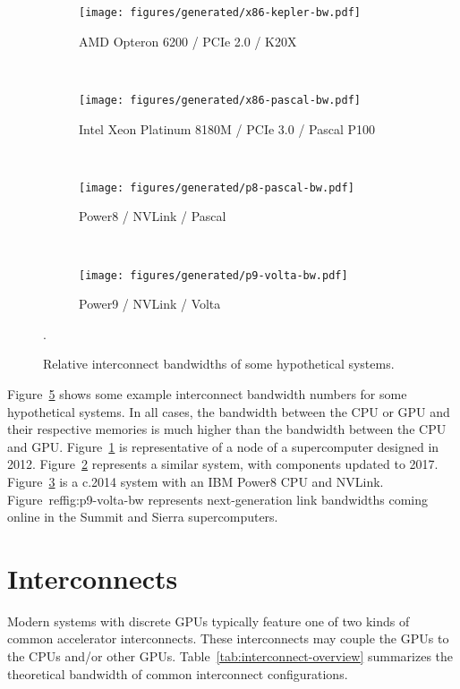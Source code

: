 \begin{figure}[ht]
    \centering
    \begin{subfigure}[b]{0.2\textwidth}
        \texttt{[image: figures/generated/x86-kepler-bw.pdf]}
        \caption{AMD Opteron 6200 / PCIe 2.0 / K20X }
        \label{fig:x86-kepler-bw}
    \end{subfigure}
	~
	\begin{subfigure}[b]{0.2\textwidth}
        \texttt{[image: figures/generated/x86-pascal-bw.pdf]}
        \caption{Intel Xeon Platinum 8180M / PCIe 3.0 / Pascal P100}
        \label{fig:x86-pascal-bw}
    \end{subfigure}
    ~
    \begin{subfigure}[b]{0.2\textwidth}
        \texttt{[image: figures/generated/p8-pascal-bw.pdf]}
        \caption{Power8 / NVLink / Pascal}
        \label{fig:p8-pascal-bw}
    \end{subfigure}
    ~
    \begin{subfigure}[b]{0.2\textwidth}
        \texttt{[image: figures/generated/p9-volta-bw.pdf]}
        \caption{Power9 / NVLink / Volta}
        \label{fig:p9-pascal-bw}
    \end{subfigure}
    \caption[]{Relative interconnect bandwidths of some hypothetical systems. \cite{amd2012opteron6200} \cite{stuechli2013power8}}.
    \label{fig:gpu-sys-arch}
\end{figure}

Figure~\ref{fig:gpu-sys-arch} shows some example interconnect bandwidth numbers for some hypothetical systems.
In all cases, the bandwidth between the CPU or GPU and their respective memories is much higher than the bandwidth between the CPU and GPU.
Figure~\ref{fig:x86-kepler-bw} is representative of a node of a supercomputer designed in 2012.
Figure~\ref{fig:x86-pascal-bw} represents a similar system, with components updated to 2017.
Figure~\ref{fig:p8-pascal-bw} is a c.2014 system with an IBM Power8 CPU and NVLink.
Figure~ref{fig:p9-volta-bw} represents next-generation link bandwidths coming online in the Summit and Sierra supercomputers.



\section{Interconnects}
\label{sec:interconnects}

Modern systems with discrete GPUs typically feature one of two kinds of common accelerator interconnects.
These interconnects may couple the GPUs to the CPUs and/or other GPUs.
Table~\ref{tab:interconnect-overview} summarizes the theoretical bandwidth of common interconnect configurations.

